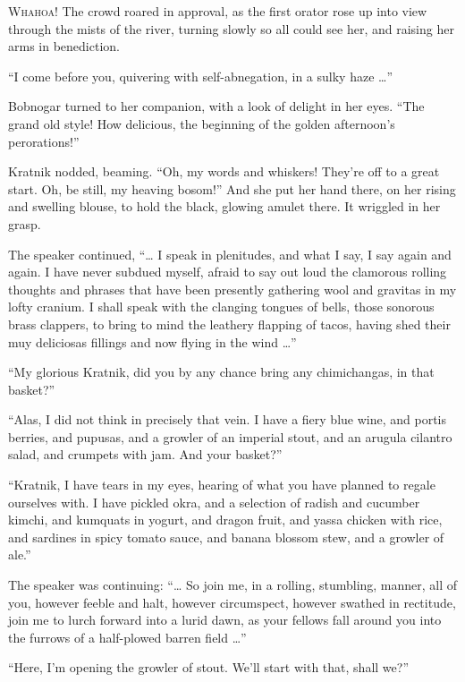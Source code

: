 
\lettrine{W}{hahoa!} The crowd roared in approval, as the first orator rose up into
view through the mists of the river, turning slowly so all could see
her, and raising her arms in benediction.

``I come before you, quivering with self-abnegation, in a sulky
haze \ldots{}''

Bobnogar turned to her companion, with a look of delight in her eyes.
``The grand old style! How delicious, the beginning of the golden
afternoon's perorations!''

Kratnik nodded, beaming. ``Oh, my words and whiskers! They're off to a
great start. Oh, be still, my heaving bosom!'' And she put her hand
there, on her rising and swelling blouse, to hold the black, glowing
amulet there. It wriggled in her grasp.

The speaker continued, ``\ldots{} I speak in plenitudes, and what I say, I
say again and again. I have never subdued myself, afraid to say out loud
the clamorous rolling thoughts and phrases that have been presently
gathering wool and gravitas in my lofty cranium. I shall speak with the
clanging tongues of bells, those sonorous brass clappers, to bring to
mind the leathery flapping of tacos, having shed their muy deliciosas
fillings and now flying in the wind \ldots{}''

``My glorious Kratnik, did you by any chance bring any chimichangas, in
that basket?''

``Alas, I did not think in precisely that vein. I have a fiery blue
wine, and portis berries, and pupusas, and a growler of an imperial
stout, and an arugula cilantro salad, and crumpets with jam. And your
basket?''

``Kratnik, I have tears in my eyes, hearing of what you have planned to
regale ourselves with. I have pickled okra, and a selection of radish
and cucumber kimchi, and kumquats in yogurt, and dragon fruit, and yassa
chicken with rice, and sardines in spicy tomato sauce, and banana
blossom stew, and a growler of ale.''

The speaker was continuing: ``\ldots{} So join me, in a rolling, stumbling,
manner, all of you, however feeble and halt, however circumspect,
however swathed in rectitude, join me to lurch forward into a lurid
dawn, as your fellows fall around you into the furrows of a half-plowed
barren field \ldots{}''

``Here, I'm opening the growler of stout. We'll start with that, shall
we?''

